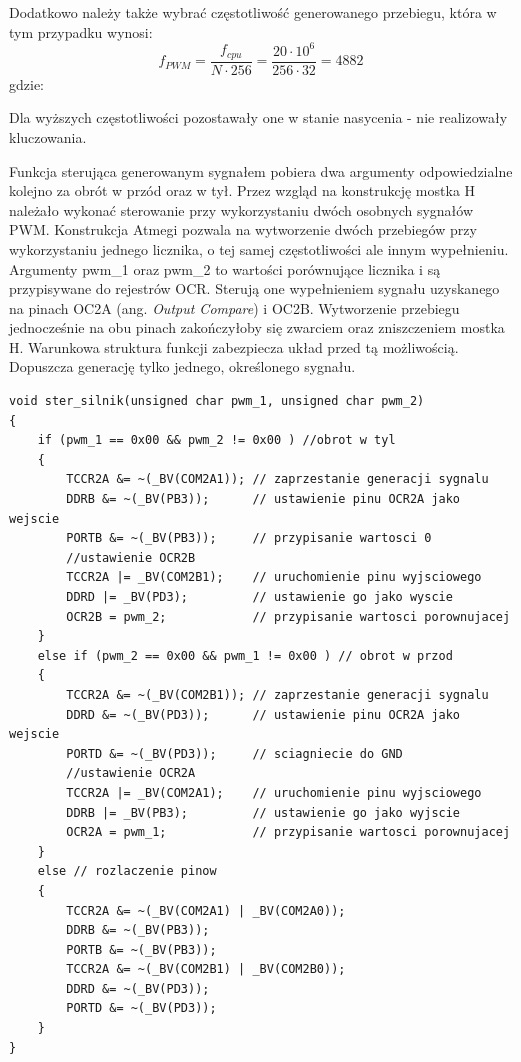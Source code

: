 \noindent
Dodatkowo należy także wybrać częstotliwość generowanego przebiegu, która w tym przypadku wynosi:
\begin{equation}
	f_{PWM} =  \frac{f_{cpu}}{N \cdot 256} = \frac{20 \cdot 10^6}{256 \cdot 32} = 4882 
   \label{eq:czest_kola}
 \end{equation}
 gdzie:  
 \begin{equationDescriptor}
 \end{equationDescriptor}
\noindent
Dla wyższych częstotliwości pozostawały one w stanie nasycenia - nie realizowały kluczowania. 

Funkcja sterująca generowanym sygnałem pobiera dwa argumenty odpowiedzialne kolejno za obrót w przód oraz w tył. Przez wzgląd na konstrukcję mostka H należało wykonać sterowanie przy wykorzystaniu dwóch osobnych sygnałów PWM. Konstrukcja Atmegi pozwala na wytworzenie dwóch przebiegów przy wykorzystaniu jednego licznika, o tej samej częstotliwości ale innym wypełnieniu. Argumenty pwm\_1 oraz pwm\_2 to wartości porównujące licznika i są przypisywane do rejestrów OCR. Sterują one wypełnieniem sygnału uzyskanego na pinach OC2A (ang. \textit{Output Compare}) i OC2B. Wytworzenie przebiegu jednocześnie na obu pinach zakończyłoby się zwarciem oraz zniszczeniem mostka H. Warunkowa struktura funkcji zabezpiecza układ przed tą możliwością. Dopuszcza generację tylko jednego, określonego sygnału. 
\begin{lstlisting}
void ster_silnik(unsigned char pwm_1, unsigned char pwm_2)
{
	if (pwm_1 == 0x00 && pwm_2 != 0x00 ) //obrot w tyl
	{
		TCCR2A &= ~(_BV(COM2A1)); // zaprzestanie generacji sygnalu
		DDRB &= ~(_BV(PB3)); 	  // ustawienie pinu OCR2A jako wejscie
		PORTB &= ~(_BV(PB3));     // przypisanie wartosci 0
		//ustawienie OCR2B
		TCCR2A |= _BV(COM2B1);    // uruchomienie pinu wyjsciowego
		DDRD |= _BV(PD3);         // ustawienie go jako wyscie
		OCR2B = pwm_2;            // przypisanie wartosci porownujacej
	}
	else if (pwm_2 == 0x00 && pwm_1 != 0x00 ) // obrot w przod
	{
		TCCR2A &= ~(_BV(COM2B1)); // zaprzestanie generacji sygnalu
		DDRD &= ~(_BV(PD3));      // ustawienie pinu OCR2A jako wejscie
		PORTD &= ~(_BV(PD3));     // sciagniecie do GND
		//ustawienie OCR2A
		TCCR2A |= _BV(COM2A1);    // uruchomienie pinu wyjsciowego
		DDRB |= _BV(PB3);         // ustawienie go jako wyjscie
		OCR2A = pwm_1;            // przypisanie wartosci porownujacej
	}
	else // rozlaczenie pinow
	{
		TCCR2A &= ~(_BV(COM2A1) | _BV(COM2A0)); 
		DDRB &= ~(_BV(PB3)); 
		PORTB &= ~(_BV(PB3)); 
		TCCR2A &= ~(_BV(COM2B1) | _BV(COM2B0)); 
		DDRD &= ~(_BV(PD3)); 
		PORTD &= ~(_BV(PD3)); 
	}
}
\end{lstlisting}

